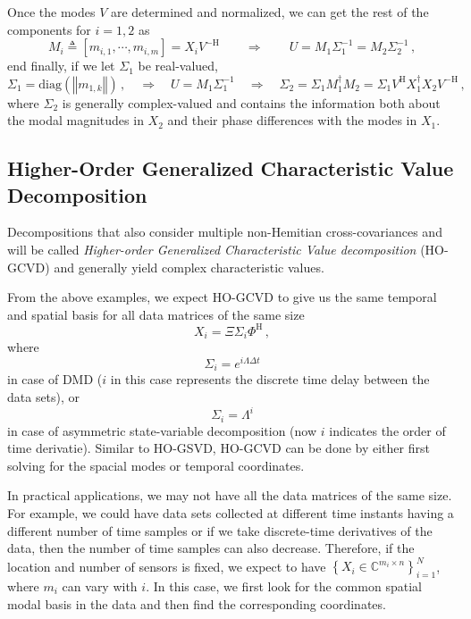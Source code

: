 \documentclass[10pt]{article}
\newcommand{\norm}[1]{\left\Vert#1\right\Vert}
\begin{document}
Once the modes $V$ are determined and normalized, we can get the rest of the components for $i = 1,2$ as
\begin{equation}
	M_i \triangleq\left[m_{i,1}, \cdots, m_{i,m} \right] = X_i V^{-\mathrm{H}} \qquad \Rightarrow \qquad U =  M_1 \Sigma_{1}^{-1} =  M_2 \Sigma_{2}^{-1}\,,
\end{equation}
end finally, if we let $\Sigma_1$ be real-valued,
\begin{equation}
\Sigma_1 = \mathrm{diag}\left(\norm{m_{1,k}}\right)\,, \quad \Rightarrow \quad U =  M_1 \Sigma_{1}^{-1}  \quad \Rightarrow \quad \Sigma_2 = \Sigma_1 M_1^{\dag} M_2 = \Sigma_1 V^\mathrm{H} X_1^{\dag} X_2 V^\mathrm{-H}\,,
\end{equation}
where $\Sigma_2$ is generally complex-valued and contains the information both about the modal magnitudes in $X_2$ and their phase differences with the modes in $X_1$.

\subsection{Higher-Order Generalized Characteristic Value Decomposition}

Decompositions that also consider multiple non-Hemitian cross-covariances and will be called {\em Higher-order Generalized Characteristic Value decomposition} (HO-GCVD) and generally yield complex characteristic values.

From the above examples, we expect HO-GCVD to give us the same temporal and spatial basis for all data matrices of the same size
\begin{equation}
    X_i=\Xi \Sigma_i\Phi^\mathrm{H}\,,
\end{equation}
where
\begin{equation}
    \Sigma_i = e^{i \Lambda \Delta t}
\end{equation}
in case of DMD ($i$ in this case represents the discrete time delay between the data sets), or
\begin{equation}
    \Sigma_i = \Lambda^i
\end{equation}
in case of asymmetric state-variable decomposition (now $i$ indicates the order of time derivatie).
Similar to HO-GSVD, HO-GCVD can be done by either first solving for the spacial modes or temporal coordinates.

In practical applications, we may not have all the data matrices of the same size.
For example, we could have data sets collected at different time instants having a different number of time samples or if we take discrete-time derivatives of the data, then the number of time samples can also decrease.
Therefore, if the location and number of sensors is fixed, we expect to have $\left\{X_i\in\mathbb{C}^{m_i\times n}\right\}_{i=1}^N$, where $m_i$ can vary with $i$.
In this case, we first look for the common spatial modal basis in the data and then find the corresponding coordinates.
\end{document}
